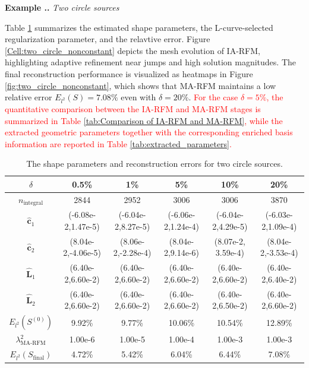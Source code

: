 \documentclass{article}
\newcommand{\red}[1]{\textcolor{red}{#1}}
\theoremstyle{plain}
\theoremstyle{definition}
\newcounter{example}[section]         %
\renewcommand{\theexample}{\thesection.\arabic{example}}
\newenvironment{example}[1][]{
    \refstepcounter{example}%
    \par\noindent\textbf{Example \theexample.} #1 \par
}{\par}
\begin{document}
{\begin{example}[\emph{Two circle sources}]
 {Table \ref{tab:two_circle_non_constant_transposed} summarizes the estimated shape parameters, the L-curve-selected regularization parameter, and the relavtive error. Figure \ref{Cell:two_circle_nonconstant} depicts the mesh evolution of IA-RFM, highlighting adaptive refinement near jumps and high solution magnitudes. The final reconstruction performance is visualized as heatmaps in Figure \ref{fig:two_circle_nonconstant}, which shows that MA-RFM maintains a low relative error $E_{l^2}(S)=7.08\%$ even with $\delta=20\%$.} \red{For the
  case $\delta=5\%$, the quantitative comparison between the IA-RFM and MA-RFM stages is summarized in Table \ref{tab:Comparison of IA-RFM and MA-RFM}, while the extracted geometric parameters together with the corresponding enriched basis information are reported in
  Table \ref{tab:extracted_parameters}.}\\
  \begin{table}[htbp]
  \color{red}
  \setlength{\tabcolsep}{2pt}
      \centering
      \caption{The shape parameters and reconstruction errors for two circle sources.}
      \begin{tabular}{c|ccccc}
          \toprule
          $\delta$ & 0.5\% & 1\% & 5\% & 10\% & 20\% \\
          \midrule
          $n_{\text{integral}}$ & 2844 & 2952 & 3006 & 3006 & 3870 \\
$\hat{\boldsymbol c}_1$ & (-6.08e-2,1.47e-5) & (-6.04e-2,8.27e-5) & (-6.06e-2,1.24e-4) & (-6.04e-2,4.29e-5) & (-6.03e-2,1.09e-4) \\
$\hat{\boldsymbol c}_2$ & (8.04e-2,-4.06e-5) & (8.06e-2,-2.28e-4) & (8.04e-2,9.14e-6) & (8.07e-2, 3.59e-4) & (8.04e-2,-3.53e-4) \\
$\hat{\boldsymbol L}_1$ & (6.40e-2,6.60e-2) & (6.40e-2,6.60e-2) & (6.40e-2,6.60e-2) & (6.40e-2,6.60e-2) & (6.40e-2,6.40e-2) \\
$\hat{ \boldsymbol L}_2$ & (6.40e-2,6.60e-2) & (6.40e-2,6.60e-2) & (6.40e-2,6.60e-2) & (6.40e-2,6.50e-2) & (6.40e-2,6.60e-2) \\
          \midrule
          $E_{l^2}(S^{(0)})$ & 9.92\% & 9.77\% & 10.06\% & 10.54\% & 12.89\% \\
          $\lambda_{\text{MA-RFM}}^2$ & 1.00e-6 & 1.00e-5 & 1.00e-4 & 1.00e-3 & 1.00e-3 \\
          $E_{l^2}(S_{\text{final}})$ & 4.72\% & 5.42\% & 6.04\% & 6.44\% & 7.08\% \\
          \bottomrule
      \end{tabular}
\label{tab:two_circle_non_constant_transposed}
  \end{table}


\end{example}}
\end{document}
